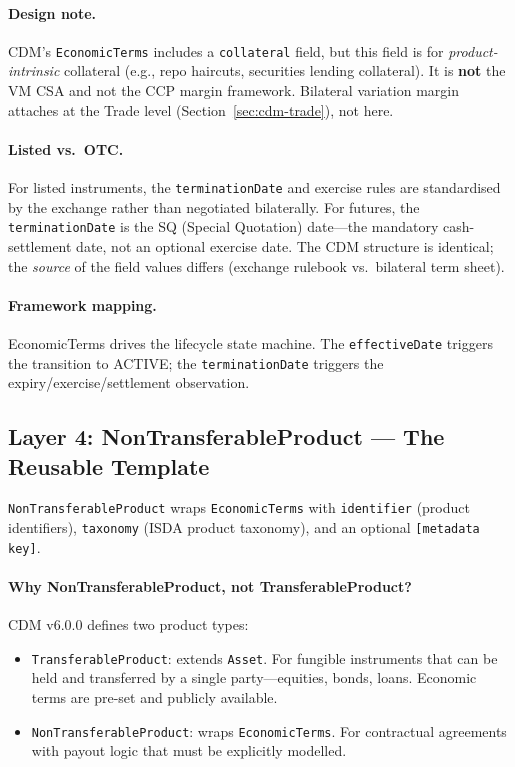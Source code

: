 \documentclass[11pt,a4paper]{article}
\begin{document}
\paragraph{Design note.} CDM's \texttt{EconomicTerms} includes a \texttt{collateral} field, but this field is for \textit{product-intrinsic} collateral (e.g., repo haircuts, securities lending collateral). It is \textbf{not} the VM CSA and not the CCP margin framework. Bilateral variation margin attaches at the Trade level (Section~\ref{sec:cdm-trade}), not here.

\paragraph{Listed vs.\ OTC.} For listed instruments, the \texttt{terminationDate} and exercise rules are standardised by the exchange rather than negotiated bilaterally. For futures, the \texttt{terminationDate} is the SQ (Special Quotation) date---the mandatory cash-settlement date, not an optional exercise date. The CDM structure is identical; the \emph{source} of the field values differs (exchange rulebook vs.\ bilateral term sheet).

\paragraph{Framework mapping.} EconomicTerms drives the lifecycle state machine. The \texttt{effectiveDate} triggers the transition to ACTIVE; the \texttt{terminationDate} triggers the expiry/exercise/settlement observation.

\subsection{Layer 4: NonTransferableProduct --- The Reusable Template}
\label{sec:cdm-product}

\texttt{NonTransferableProduct} wraps \texttt{EconomicTerms} with \texttt{identifier} (product identifiers), \texttt{taxonomy} (ISDA product taxonomy), and an optional \texttt{[metadata key]}.

\paragraph{Why NonTransferableProduct, not TransferableProduct?} CDM v6.0.0 defines two product types:
\begin{itemize}[nosep]
\item \texttt{TransferableProduct}: extends \texttt{Asset}. For fungible instruments that can be held and transferred by a single party---equities, bonds, loans. Economic terms are pre-set and publicly available.
\item \texttt{NonTransferableProduct}: wraps \texttt{EconomicTerms}. For contractual agreements with payout logic that must be explicitly modelled.
\end{itemize}
\end{document}
